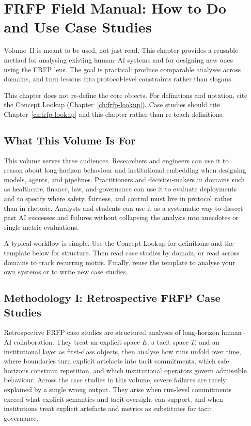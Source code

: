 \chapter{FRFP Field Manual: How to Do and Use Case Studies}
\label{ch:frfp-field-manual}

Volume~II is meant to be used, not just read. This chapter provides a reusable method for analysing existing human--AI systems and for designing new ones using the FRFP lens. The goal is practical: produce comparable analyses across domains, and turn lessons into protocol-level constraints rather than slogans.

This chapter does not re-define the core objects. For definitions and notation, cite the Concept Lookup (Chapter~\ref{ch:frfp-lookup}). Case studies should cite Chapter~\ref{ch:frfp-lookup} and this chapter rather than re-teach definitions.

\section{What This Volume Is For}

This volume serves three audiences. Researchers and engineers can use it to reason about long-horizon behaviour and institutional embedding when designing models, agents, and pipelines. Practitioners and decision-makers in domains such as healthcare, finance, law, and governance can use it to evaluate deployments and to specify where safety, fairness, and control must live in protocol rather than in rhetoric. Analysts and students can use it as a systematic way to dissect past AI successes and failures without collapsing the analysis into anecdotes or single-metric evaluations.

A typical workflow is simple. Use the Concept Lookup for definitions and the template below for structure. Then read case studies by domain, or read across domains to track recurring motifs. Finally, reuse the template to analyse your own systems or to write new case studies.

\section{Methodology I: Retrospective FRFP Case Studies}
\label{sec:frfp-retrospective}

Retrospective FRFP case studies are structured analyses of long-horizon human--AI collaboration. They treat an explicit space \(E\), a tacit space \(T\), and an institutional layer as first-class objects, then analyse how runs unfold over time, where boundaries turn explicit artefacts into tacit commitments, which safe horizons constrain repetition, and which institutional operators govern admissible behaviour. Across the case studies in this volume, severe failures are rarely explained by a single wrong output. They arise when run-level commitments exceed what explicit semantics and tacit oversight can support, and when institutions treat explicit artefacts and metrics as substitutes for tacit governance.


